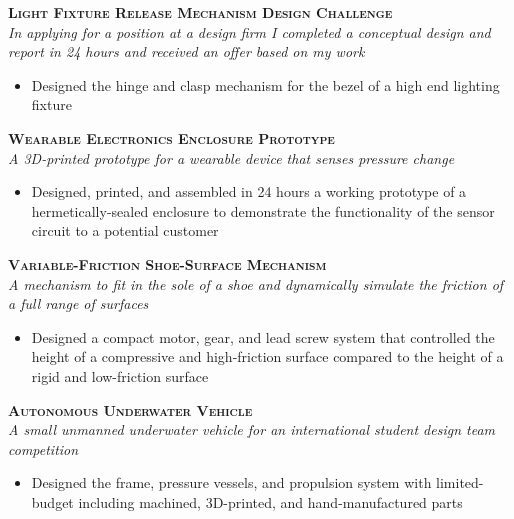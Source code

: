 \documentclass[12pt, landscape]{article}
\begin{document}
  \clearpage

  \begin{samepage}
    \textbf{\scshape Light Fixture Release Mechanism Design Challenge}\\
    \textit{In applying for a position at a design firm I completed a conceptual design and report in 24 hours and received an offer based on my work}
    \begin{itemize}      
      \item Designed the hinge and clasp mechanism for the bezel of a high end lighting fixture
    \end{itemize}
  \end{samepage}

  \begin{samepage}
    \textbf{\scshape Wearable Electronics Enclosure Prototype}\\
    \textit{A 3D-printed prototype for a wearable device that senses pressure change}
    \begin{itemize}      
      \item Designed, printed, and assembled in 24 hours a working prototype of a hermetically-sealed enclosure to demonstrate the functionality of the sensor circuit to a potential customer
    \end{itemize}
  \end{samepage}

  \begin{samepage}
    \textbf{\scshape Variable-Friction Shoe-Surface Mechanism}\\
    \textit{A mechanism to fit in the sole of a shoe and dynamically simulate the friction of a full range of surfaces}
    \begin{itemize}      
      \item Designed a compact motor, gear, and lead screw system that controlled the height of a compressive and high-friction surface compared to the height of a rigid and low-friction surface
    \end{itemize}
  \end{samepage}

  \begin{samepage}
    \textbf{\scshape Autonomous Underwater Vehicle}\\
    \textit{A small unmanned underwater vehicle for an international student design team competition}
    \begin{itemize}      
      \item Designed the frame, pressure vessels, and propulsion system with limited-budget including machined, 3D-printed, and hand-manufactured parts
    \end{itemize}
  \end{samepage}
\end{document}
